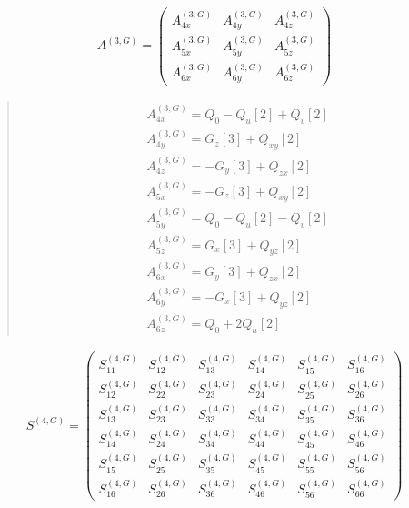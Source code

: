 \documentclass[fleqn,10pt]{jsarticle}
\begin{document}
\begin{align*}
A^{(3,G)} = \begin{pmatrix} A^{(3,G)}_{4x} & A^{(3,G)}_{4y} & A^{(3,G)}_{4z} \\ A^{(3,G)}_{5x} & A^{(3,G)}_{5y} & A^{(3,G)}_{5z} \\ A^{(3,G)}_{6x} & A^{(3,G)}_{6y} & A^{(3,G)}_{6z} \end{pmatrix}
\end{align*}
\begin{quote}
\begin{align*}
& A^{(3,G)}_{4x} = Q_{0} - Q_{u}[2] + Q_{v}[2] \\
& A^{(3,G)}_{4y} = G_{z}[3] + Q_{xy}[2] \\
& A^{(3,G)}_{4z} = - G_{y}[3] + Q_{zx}[2] \\
& A^{(3,G)}_{5x} = - G_{z}[3] + Q_{xy}[2] \\
& A^{(3,G)}_{5y} = Q_{0} - Q_{u}[2] - Q_{v}[2] \\
& A^{(3,G)}_{5z} = G_{x}[3] + Q_{yz}[2] \\
& A^{(3,G)}_{6x} = G_{y}[3] + Q_{zx}[2] \\
& A^{(3,G)}_{6y} = - G_{x}[3] + Q_{yz}[2] \\
& A^{(3,G)}_{6z} = Q_{0} + 2 Q_{u}[2]
\end{align*}
\end{quote}
\begin{align*}
S^{(4,G)} = \begin{pmatrix} S^{(4,G)}_{11} & S^{(4,G)}_{12} & S^{(4,G)}_{13} & S^{(4,G)}_{14} & S^{(4,G)}_{15} & S^{(4,G)}_{16} \\ S^{(4,G)}_{12} & S^{(4,G)}_{22} & S^{(4,G)}_{23} & S^{(4,G)}_{24} & S^{(4,G)}_{25} & S^{(4,G)}_{26} \\ S^{(4,G)}_{13} & S^{(4,G)}_{23} & S^{(4,G)}_{33} & S^{(4,G)}_{34} & S^{(4,G)}_{35} & S^{(4,G)}_{36} \\ S^{(4,G)}_{14} & S^{(4,G)}_{24} & S^{(4,G)}_{34} & S^{(4,G)}_{44} & S^{(4,G)}_{45} & S^{(4,G)}_{46} \\ S^{(4,G)}_{15} & S^{(4,G)}_{25} & S^{(4,G)}_{35} & S^{(4,G)}_{45} & S^{(4,G)}_{55} & S^{(4,G)}_{56} \\ S^{(4,G)}_{16} & S^{(4,G)}_{26} & S^{(4,G)}_{36} & S^{(4,G)}_{46} & S^{(4,G)}_{56} & S^{(4,G)}_{66} \end{pmatrix}
\end{align*}
\end{document}
